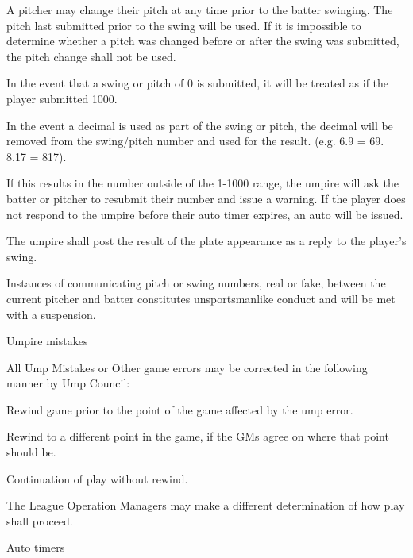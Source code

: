 \begin{deepEnumerate}
\begin{deepEnumerate}
\begin{deepEnumerate}
			\item A pitcher may change their pitch at any time prior to the batter swinging. The pitch last submitted prior to the swing will be used.
			If it is impossible to determine whether a pitch was changed before or after the swing was submitted, the pitch change shall not be used.
			\item In the event that a swing or pitch of 0 is submitted, it will be treated as if the player submitted 1000.
			\item In the event a decimal is used as part of the swing or pitch, the decimal will be removed from the swing/pitch number and used for the result. (e.g. 6.9 = 69. 8.17 = 817). 
			\begin{deepEnumerate}
				\item If this results in the number outside of the 1-1000 range, the umpire will ask the batter or pitcher to resubmit their number and issue a warning. If the player does not respond to the umpire before their auto timer expires, an auto will be issued. 
			\end{deepEnumerate}
		\end{deepEnumerate}
		\item The umpire shall post the result of the plate appearance as a reply to the player's swing.
		\item Instances of communicating pitch or swing numbers, real or fake, 
		between the current pitcher and batter constitutes unsportsmanlike conduct and will be met with a suspension.
		\item Umpire mistakes
		\begin{deepEnumerate}
			\item All Ump Mistakes or Other game errors may be corrected in the following manner by Ump Council:
			\begin{deepEnumerate}
				\item Rewind game prior to the point of the game affected by the ump error.
				\item Rewind to a different point in the game, if the GMs agree on where that point should be.
				\item Continuation of play without rewind.
			\end{deepEnumerate}
			\item The League Operation Managers may make a different determination of how play shall proceed.
		\end{deepEnumerate}
	\end{deepEnumerate}
	\item Auto timers

\end{deepEnumerate}
